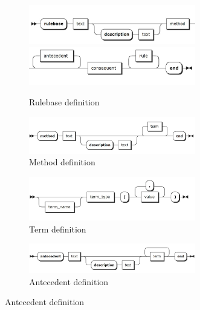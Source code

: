 \begin{figure}[!h]
	\centering
	\begin{subfigure}[b]{0.8\textwidth}
		\centering
        	\includegraphics[width=0.8\textwidth]{images/rulebase_1}
		\includegraphics[width=0.8\textwidth]{images/rulebase_2}
        	\caption{Rulebase definition}
    \end{subfigure}
	
	\begin{subfigure}[b]{0.9\textwidth}
        	\centering
        	\includegraphics[width=0.8\textwidth]{images/method}
		\caption{Method definition}
    \end{subfigure}
    
    \begin{subfigure}[b]{0.9\textwidth}
        	\centering
        	\includegraphics[width=0.8\textwidth]{images/term}
		\caption{Term definition}
    \end{subfigure}
    
    \begin{subfigure}[b]{0.9\textwidth}
        	\centering
        	\includegraphics[width=0.8\textwidth]{images/antecedent}
		\caption{Antecedent definition}
    \end{subfigure}
    

\end{figure}
